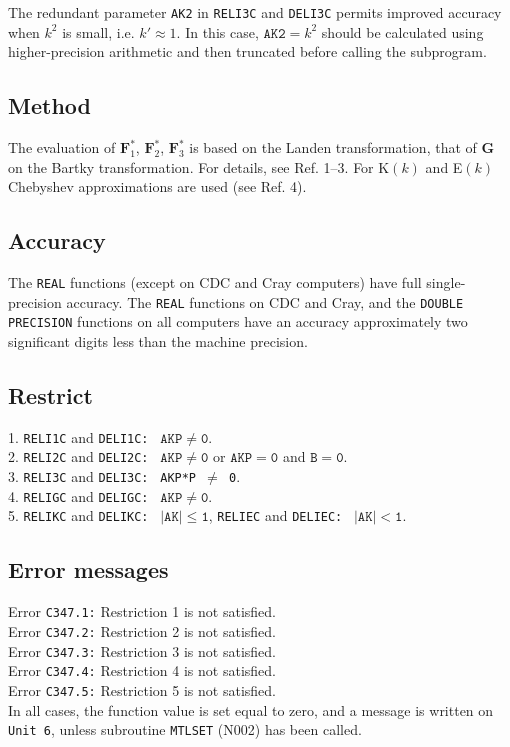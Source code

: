 \documentclass[]{article}
\begin{document}
The redundant parameter \texttt{AK2} in \texttt{RELI3C} and \texttt{DELI3C}
permits improved accuracy when $k^2$ is small, i.e. $k' \approx 1$. In
this case, $\mathtt{AK2} = k^2$ should be calculated using
higher-precision arithmetic and then truncated before calling the
subprogram.
\newpage
\subsection{Method}
The evaluation of $\mathbf{F}_1^*$, $\mathbf{F}_2^*$, $\mathbf{F}_3^*$
is based on the Landen transformation, that of $\mathbf{G}$ on the Bartky
transformation. For details, see Ref. 1--3. For K$(k)$ and E$(k)$
Chebyshev approximations are used (see Ref. 4).
\subsection{Accuracy}
The \texttt{REAL} functions (except on CDC and Cray computers) have full
single-precision accuracy. The \texttt{REAL} functions on CDC and Cray, and
the \texttt{DOUBLE PRECISION} functions on all computers have an accuracy
approximately two significant digits less than the machine precision.
\subsection{Restrict}
1. \quad \texttt{RELI1C} and \texttt{DELI1C:} \ $\mathtt{AKP \ne 0}$. \\
2. \quad \texttt{RELI2C} and \texttt{DELI2C:} \ $\mathtt{AKP \ne 0}$
or $\mathtt{AKP = 0}$ and $\mathtt{B = 0}$. \\
3. \quad \texttt{RELI3C} and \texttt{DELI3C:} \ \texttt{AKP*P $\ne$ 0}. \\
4. \quad \texttt{RELIGC} and \texttt{DELIGC:} \ $\mathtt{AKP \ne 0}$. \\
5. \quad \texttt{RELIKC} and \texttt{DELIKC:} \ $\mathtt{|AK| \le 1}$, \qquad
\texttt{RELIEC} and \texttt{DELIEC:} \ $\mathtt{|AK| < 1}$. \\
\subsection{Error messages}
Error \texttt{C347.1:} Restriction 1 is not satisfied. \\
Error \texttt{C347.2:} Restriction 2 is not satisfied. \\
Error \texttt{C347.3:} Restriction 3 is not satisfied. \\
Error \texttt{C347.4:} Restriction 4 is not satisfied. \\
Error \texttt{C347.5:} Restriction 5 is not satisfied. \\
In all cases, the function value
is set equal to zero, and a message is written on \texttt{Unit 6},
unless subroutine \texttt{MTLSET} (N002) has been called.
\end{document}
